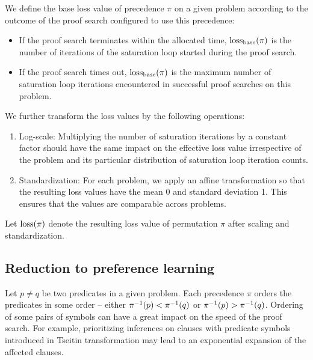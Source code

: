 We define the base loss
value of precedence \(\pi\) on a given problem
according to the outcome of the proof search configured to use this precedence:

\begin{itemize}
	\item If the proof search terminates within the allocated time,
	\(\base_loss(\pi)\) is the number of iterations of the saturation loop
	started during the proof search.
	\item If the proof search times out, \(\base_loss(\pi)\) is the maximum number
	of saturation loop iterations encountered in successful proof searches on this problem.
\end{itemize}

We further transform the loss values by the following operations:

\begin{enumerate}
	\item Log-scale: Multiplying the number of saturation iterations by a constant factor
	should have the same impact on the effective loss value
	irrespective of the problem and its particular distribution of saturation loop iteration counts.
	\item Standardization\cite{?}: For each problem,
	we apply an affine transformation so that the resulting loss values
	have the mean 0 and standard deviation 1.
	This ensures that the values are comparable across problems.
\end{enumerate}

Let \(\operatorname{loss}(\pi)\) denote the resulting loss value of permutation \(\pi\)
after scaling and standardization.

\subsection{Reduction to preference learning}

Let \(p \neq q\) be two predicates in a given \gls{problem}.
Each precedence \(\pi\) orders the predicates in some order --
either \(\pi^{-1}(p) < \pi^{-1}(q)\) or \(\pi^{-1}(p) > \pi^{-1}(q)\).
Ordering of some pairs of symbols can have a great impact on the speed of the proof search.
For example, prioritizing inferences on clauses with predicate symbols
introduced in Tseitin transformation
may lead to an exponential expansion of the affected clauses.

